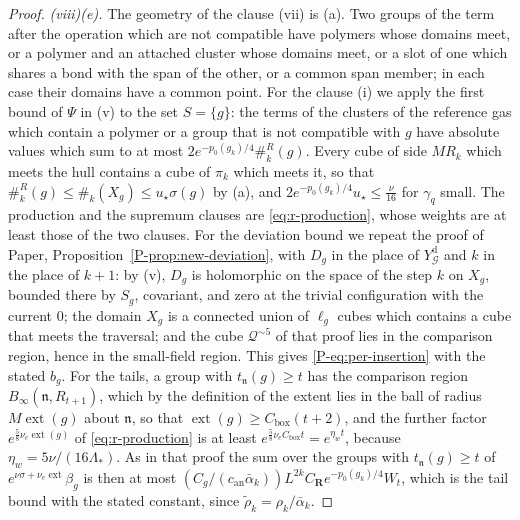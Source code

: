 \documentclass[11pt]{preprint}
\numberwithin{equation}{section}
\theoremstyle{definition}
\theoremstyle{remark}
\theoremstyle{plain}
\begin{document}
\begin{proof}
\emph{(viii)(e).} The geometry of the clause (vii) is (a). Two groups of the term after the operation which are not compatible have polymers whose domains meet, or a polymer and an attached cluster whose domains meet, or a slot of one which shares a bond with the span of the other, or a common span member; in each case their domains have a common point. For the clause (i) we apply the first bound of $\Psi$ in (v) to the set $S = \{ g \}$: the terms of the clusters of the reference gas which contain a polymer or a group that is not compatible with $g$ have absolute values which sum to at most $2e^{-p_0(g_k)/4}\#^R_k(g)$. Every cube of side $MR_k$ which meets the hull contains a cube of $\pi_k$ which meets it, so that $\#^R_k(g) \leq \#_k(X_g) \leq u_\star\sigma(g)$ by (a), and $2e^{-p_0(g_k)/4}u_\star \leq \frac{\nu}{16}$ for $\gamma_q$ small. The production and the supremum clauses are \eqref{eq:r-production}, whose weights are at least those of the two clauses. For the deviation bound we repeat the proof of Paper, Proposition~\ref{P-prop:new-deviation}, with $D_g$ in the place of $Y^{\mathrm d}_{\mathcal G}$ and $k$ in the place of $k + 1$: by (v), $D_g$ is holomorphic on the space of the step $k$ on $X_g$, bounded there by $S_g$, covariant, and zero at the trivial configuration with the current $0$; the domain $X_g$ is a connected union of $\ell_g$ cubes which contains a cube that meets the traversal; and the cube $\mathcal Q^{\sim5}$ of that proof lies in the comparison region, hence in the small-field region. This gives \eqref{P-eq:per-insertion} with the stated $b_g$. For the tails, a group with $t_{\mathfrak n}(g) \geq t$ has the comparison region $B_\infty(\mathfrak n, R_{t+1})$, which by the definition of the extent lies in the ball of radius $M\operatorname{ext}(g)$ about $\mathfrak n$, so that $\operatorname{ext}(g) \geq C_{\mathrm{box}}(t + 2)$, and the further factor $e^{\frac58\nu_e\operatorname{ext}(g)}$ of \eqref{eq:r-production} is at least $e^{\frac58\nu_eC_{\mathrm{box}}t} = e^{\eta_wt}$, because $\eta_w = 5\nu/(16\Lambda_*)$. As in that proof the sum over the groups with $t_{\mathfrak n}(g) \geq t$ of $e^{\nu\sigma + \nu_e\operatorname{ext}}\beta_g$ is then at most $(C_g/(c_{\mathrm{an}}\bar\alpha_k))L^{2k}C_{\mathbf R}e^{-p_0(g_k)/4}W_t$, which is the tail bound with the stated constant, since $\tilde\rho_k = \rho_k/\bar\alpha_k$.


\end{proof}
\end{document}
